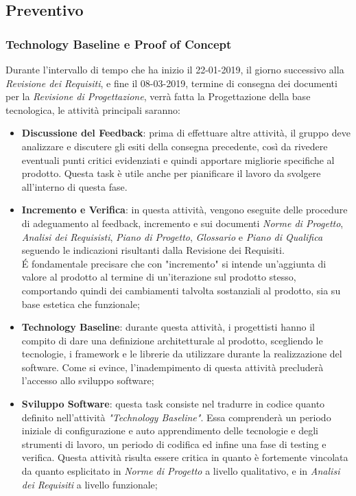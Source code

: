 \clearpage
\subsection{Preventivo}
\label{sec:preventivo}
\subsubsection{Technology Baseline e Proof of Concept}
\label{sec:technology_baseline}
Durante l'intervallo di tempo che ha inizio il 22-01-2019, il giorno successivo alla \emph{Revisione dei Requisiti}, e fine il 08-03-2019, termine di consegna dei documenti per la \emph{Revisione di Progettazione}, verrà fatta la Progettazione della base tecnologica, le attività principali saranno:
	\begin{itemize}
	\item \textbf{Discussione del Feedback}: prima di effettuare altre attività, il gruppo deve analizzare e discutere gli esiti della consegna precedente, così da rivedere eventuali punti critici evidenziati e quindi apportare migliorie  specifiche al prodotto. Questa task è utile anche per pianificare il lavoro da svolgere all'interno di questa fase.   
	\item \textbf{Incremento e Verifica}: in questa attività, vengono eseguite delle procedure di adeguamento al feedback, incremento e  sui documenti \emph{Norme di Progetto}, \emph{Analisi dei Requisisti}, \emph{Piano di Progetto}, \emph{Glossario} e \emph{Piano di Qualifica} seguendo le indicazioni risultanti dalla Revisione dei Requisiti. \\ 	\'E fondamentale precisare che con "incremento" si intende un'aggiunta di valore al prodotto al termine di un'iterazione sul prodotto stesso, comportando quindi dei cambiamenti talvolta sostanziali al prodotto, sia su base estetica che funzionale;
	\item \textbf{Technology Baseline}: durante questa attività, i progettisti hanno il compito di dare una definizione architetturale al prodotto, scegliendo le tecnologie, i framework e le librerie da utilizzare durante la realizzazione del software. Come si evince, l'inadempimento di questa attività precluderà l'accesso allo sviluppo software;
	\item \textbf{Sviluppo Software}: questa task consiste nel tradurre in codice quanto definito nell'attività \emph{"Technology Baseline"}. Essa comprenderà un periodo iniziale di configurazione e auto apprendimento delle tecnologie e degli strumenti di lavoro, un periodo di codifica ed infine una fase di testing e verifica. Questa attività risulta essere critica in quanto è fortemente vincolata da quanto esplicitato in \emph{Norme di Progetto} a livello qualitativo, e in \emph{Analisi dei Requisiti} a livello funzionale;

\end{itemize}
